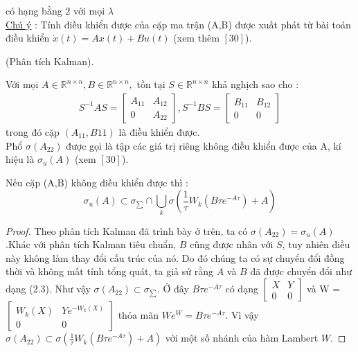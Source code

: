  có hạng bằng 2 với mọi $\lambda$ \\	
 \underline{Chú ý} : Tính điều khiển được của cặp ma trận (A,B) được xuất phát từ bài toán điều khiển $\dot{x}(t) = Ax(t) + Bu(t)$ (xem thêm $[30]$). \\
 \begin{bd}
 (Phân tích Kalman).
 \end{bd} 
Với mọi $A \in \mathbb{R}^{n \times n}, B \in \mathbb{R}^{n \times n}, \mbox{ tồn tại } S \in \mathbb{R}^{n \times n}$ khả nghịch sao cho : \\
\begin{align}
 S^{-1}AS = \begin{bmatrix}
 				A_{11} & A_{12} \\
 				0 & A_{22}
 			 \end{bmatrix} ,
 S^{-1}BS = \begin{bmatrix}
 				B_{11} & B_{12} \\
 				0 & 0
 			 \end{bmatrix}
\end{align}
 trong đó cặp $(A_{11},B{11})$ là điều khiển được. \\
 Phổ $\sigma(A_{22})$ được gọi là tập các giá trị riêng không điều khiển được của A, kí hiệu là $\sigma_{u}(A)$ (xem $[30]$).
 \begin{dl}
 Nếu cặp (A,B) không điều khiển được thì :
 $$ \sigma_{u}(A) \subset \sigma_{\sum} \cap \displaystyle \bigcup_{k}\sigma(\frac{1}{\tau}W_{k}(B\tau e^{-A\tau})+A) $$
 \end{dl}
\begin{proof}
Theo phân tích Kalman đã trình bày ở trên, ta có $\sigma(A_{22}) = \sigma_{u}(A)$.Khác với phân tích Kalman tiêu chuẩn, $B$ cũng được nhân với $S$, tuy nhiên điều này không làm thay đổi cấu trúc của nó. Do đó chúng ta có sự chuyển đổi đồng thời và không mất tính tổng quát, ta giả sử rằng $A$ và $B$ đã được chuyển đổi như dạng (2.3). Như vậy $\sigma(A_{22}) \subset \sigma_{\sum}$. Ở đây $B\tau e^{-A\tau}$ có dạng $\begin{bmatrix}
 X & Y \\
 0 & 0
 \end{bmatrix}$ và W = $\begin{bmatrix}
 W_{k}(X) & Ye^{-W_{k}(X)} \\
 0 & 0
 \end{bmatrix}$ thỏa mãn $We^{W} = B\tau e^{-A\tau}$. Vì vậy $\sigma(A_{22}) \subset \sigma(\frac{1}{\tau}W_{k}(B\tau e^{-A\tau})+A)$ với một số nhánh của hàm Lambert $W$.
\end{proof} 
 

